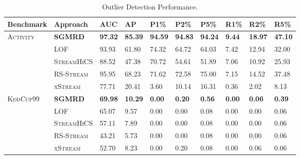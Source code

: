 \begin{table}[]
	\renewrobustcmd{\boldmath}{}
	\centering
	\caption{Outlier Detection Performance.}
	\label{result:sgmrd_outlierdetection}
	\footnotesize
	\renewcommand{\arraystretch}{0.68}
	\begin{tabularx}{\textwidth}{@{}XXllllllll@{}}
		\toprule
		Benchmark & Approach       & AUC            & AP             & P1\%           & P2\%           & P5\%           & R1\%           & R2\%           & R5\%           \\ \midrule
		\textsc{Activity}  & \textsc{\textbf{\gls{SGMRD}}} & \textbf{97.32} & \textbf{85.39} & \textbf{94.59} & \textbf{94.83} & \textbf{94.24} & \textbf{9.44}  & \textbf{18.97} & \textbf{47.10} \\
		& \textsc{\gls{LOF}}      & 93.93          & 61.80          & 74.32          & 64.72          & 64.03          & 7.42           & 12.94          & 32.00          \\
		& \textsc{Stream\gls{HiCS}}     & 88.52          & 47.38          & 70.72          & 54.61          & 51.89          & 7.06           & 10.92          & 25.93          \\
		& \textsc{\gls{RS-Stream}}      & 95.95          & 68.23          & 71.62          & 72.58          & 75.00          & 7.15           & 14.52          & 37.48          \\
		& \textsc{xStream}        & 77.71          & 20.41          & 3.60           & 10.14          & 16.31          & 0.36           & 2.02           & 8.13           \\ \midrule
		\textsc{KddCup99}  & \textbf{\gls{SGMRD}} & \textbf{69.98} & \textbf{10.29} & \textbf{0.00}  & \textbf{0.20}  & \textbf{0.56}  & \textbf{0.00}  & \textbf{0.06}  & \textbf{0.39}  \\
		& \textsc{LOF}      & 65.07          & 9.57           & 0.00           & 0.00           & 0.08           & 0.00           & 0.00           & 0.06           \\
		& \textsc{Stream\gls{HiCS}}     & 57.11          & 7.89           & 0.00           & 0.00           & 0.08           & 0.00           & 0.00           & 0.06           \\
		& \textsc{\gls{RS-Stream}}      & 43.21          & 5.73           & 0.00           & 0.00           & 0.08           & 0.00           & 0.00           & 0.06           \\
		& \textsc{xStream}        & 52.70          & 8.23           & 0.00           & 0.20           & 0.08           & 0.00           & 0.06           & 0.06           \\ \midrule

\end{tabularx}
\end{table}
